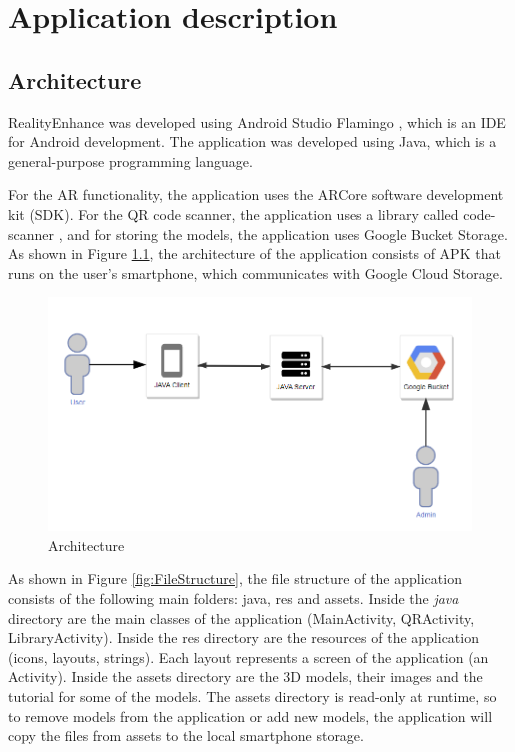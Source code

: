\chapter{Application description}\label{chapter:appdescription}

\section{Architecture}
RealityEnhance was developed using Android Studio Flamingo \cite{AndroidStudio}, which is an \ac{IDE} for Android development. The application was developed using Java\cite{Java}, which is a general-purpose programming language.

For the \ac{AR} functionality, the application uses the ARCore software development kit (SDK).
For the \ac{QR} code scanner, the application uses a library called code-scanner \cite{code-scanner}, and for storing the models, the application uses Google Bucket Storage.
As shown in Figure \ref{fig:architecture}, the architecture of the application consists of \ac{APK} that runs on the user's smartphone, which communicates with Google Cloud Storage.

\begin{figure}[ht]
    \centering
    \includegraphics[width=1\textwidth]{img/architecture.png}
    \caption{Architecture}
    \label{fig:architecture}
\end{figure}

\newpage

As shown in Figure \ref{fig:FileStructure}, the file structure of the application consists of the following main folders: java, res and assets. Inside the \textit{java} directory are the main classes of the application (MainActivity, QRActivity, LibraryActivity). Inside the res directory are the resources of the application (icons, layouts, strings). Each layout represents a screen of the application (an Activity). Inside the assets directory are the \ac{3D} models, their images and the tutorial for some of the models. The assets directory is read-only at runtime, so to remove models from the application or add new models, the application will copy the files from assets to the local smartphone storage.

